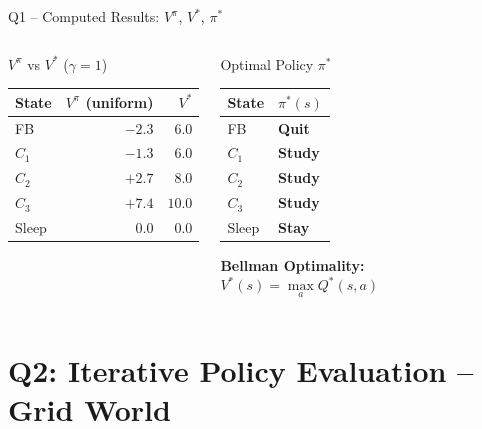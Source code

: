 \documentclass[aspectratio=169,12pt]{beamer}
\newcommand{\Vstar}{V^{*}}
\newcommand{\Qstar}{Q^{*}}
\newcommand{\pistar}{\pi^{*}}
\begin{document}
\begin{frame}{Q1 -- Computed Results: $V^\pi$, $V^*$, $\pi^*$}
  \begin{columns}[T]
    \begin{block}{$V^\pi$ vs $V^*$ ($\gamma=1$)}
      \scriptsize
      \begin{tabular}{lrr}
        \toprule
        State & $V^\pi$ (uniform) & $V^*$ \\
        \midrule
        FB     & $-2.3$ & $6.0$ \\
        $C_1$  & $-1.3$ & $6.0$ \\
        $C_2$  & $+2.7$ & $8.0$ \\
        $C_3$  & $+7.4$ & $10.0$ \\
        Sleep  & $0.0$ & $0.0$ \\
        \bottomrule
      \end{tabular}
    \end{block}

    \begin{block}{Optimal Policy $\pistar$}
      \scriptsize
      \begin{tabular}{ll}
        \toprule
        State & $\pistar(s)$ \\
        \midrule
        FB     & \textbf{Quit} \\
        $C_1$  & \textbf{Study} \\
        $C_2$  & \textbf{Study} \\
        $C_3$  & \textbf{Study} \\
        Sleep  & \textbf{Stay} \\
        \bottomrule
      \end{tabular}

      \medskip
      \textbf{Bellman Optimality:}
      \[
        \Vstar(s) = \max_a \Qstar(s,a)
      \]
    \end{block}
  \end{columns}
\end{frame}

\section{Q2: Iterative Policy Evaluation -- Grid World}
\end{document}
